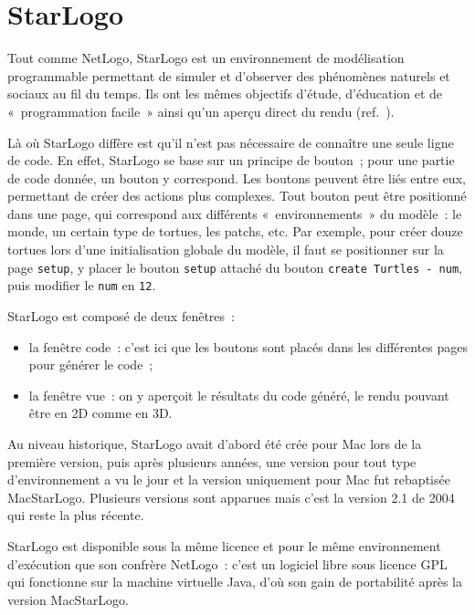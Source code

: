 \section{StarLogo}
\label{StarLogo}
Tout comme NetLogo, StarLogo est un environnement de modélisation programmable permettant de simuler et d'observer des phénomènes naturels et sociaux au fil du temps.
Ils ont les mêmes objectifs d'étude, d'éducation et de «~programmation facile~» ainsi qu'un aperçu direct du rendu (ref.~\cite{starlogo}).

Là où StarLogo diffère est qu'il n'est pas nécessaire de connaître une seule ligne de code. En effet, StarLogo se base sur un principe de bouton~; pour une partie de code donnée, un bouton y correspond. Les boutons peuvent être liés entre eux, permettant de créer des actions plus complexes.
Tout bouton peut être positionné dans une page, qui correspond aux différents «~environnements~» du modèle~: le monde, un certain type de tortues, les patchs, etc.
Par exemple, pour créer douze tortues lors d'une initialisation globale du modèle, il faut se positionner sur la page \verb|setup|, y placer le bouton \verb|setup| attaché du bouton \verb|create Turtles - num|, puis modifier le \verb|num| en \verb|12|.

StarLogo est composé de deux fenêtres~:
\begin{itemize}
  \item la fenêtre code~: c'est ici que les boutons sont placés dans les différentes pages pour générer le code~;
  \item la fenêtre vue~: on y aperçoit le résultats du code généré, le rendu pouvant être en 2D comme en 3D.
\end{itemize}

Au niveau historique, StarLogo avait d'abord été crée pour Mac lors de la première version, puis après plusieurs années, une version pour tout type d'environnement a vu le jour et la version uniquement pour Mac fut rebaptisée MacStarLogo. Plusieurs versions sont apparues mais c'est la version 2.1 de 2004 qui reste la plus récente.

StarLogo est disponible sous la même licence et pour le même environnement d'exécution que son confrère NetLogo~: c'est un logiciel libre sous licence GPL qui fonctionne sur la machine virtuelle Java, d'où son gain de portabilité après la version MacStarLogo.
